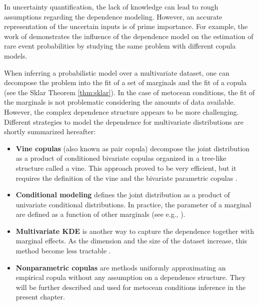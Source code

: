 In uncertainty quantification, the lack of knowledge can lead to rough assumptions regarding the dependence modeling. 
However, an accurate representation of the uncertain inputs is of prime importance. 
For example, the work of \citet{torre_2019_copula_reliability} demonstrates the influence of the dependence model on the estimation of rare event probabilities by studying the same problem with different copula models. 

When inferring a probabilistic model over a multivariate dataset, one can decompose the problem into the fit of a set of marginals and the fit of a copula (see the Sklar Theorem \ref{thm:sklar}). 
In the case of metocean conditions, the fit of the marginals is not problematic considering the amounts of data available. 
However, the complex dependence structure appears to be more challenging. 
Different strategies to model the dependence for multivariate distributions are shortly summarized hereafter: 
\begin{itemize}
    \item \textbf{Vine copulas} (also known as pair copula) decompose the joint distribution as a product of conditioned bivariate copulas organized in a tree-like structure called a vine. 
    This approach proved to be very efficient, but it requires the definition of the vine and the bivariate parametric copulas \citep{joe2011dependence}. 
    \item \textbf{Conditional modeling} defines the joint distribution as a product of univariate conditional distributions. 
    In practice, the parameter of a marginal are defined as a function of other marginals (see e.g., \citealt{vanem_fekhari_2023}). 
    \item \textbf{Multivariate KDE} is another way to capture the dependence together with marginal effects. As the dimension and the size of the dataset increase, this method become less tractable \citep{wand_jones_1994_kde}.  
    \item \textbf{Nonparametric copulas} are methods uniformly approximating an empirical copula without any assumption on a dependence structure. They will be further described and used for metocean conditions inference in the present chapter.    
\end{itemize}

